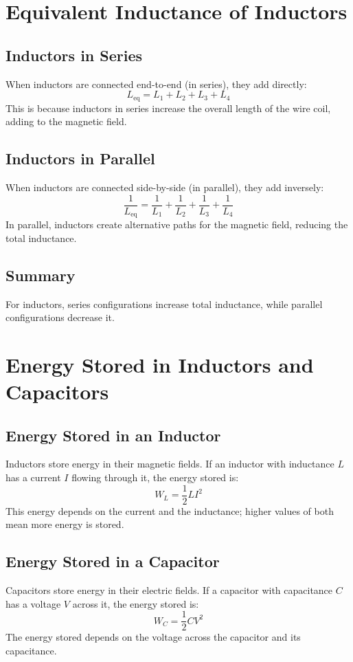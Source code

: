 \documentclass{article}
\begin{document}
\newpage
\section{Equivalent Inductance of Inductors}

\subsection{Inductors in Series}
When inductors are connected end-to-end (in series), they add directly:
\[
L_{\text{eq}} = L_1 + L_2 + L_3 + L_4
\]
This is because inductors in series increase the overall length of the wire coil, adding to the magnetic field.

\subsection{Inductors in Parallel}
When inductors are connected side-by-side (in parallel), they add inversely:
\[
\frac{1}{L_{\text{eq}}} = \frac{1}{L_1} + \frac{1}{L_2} + \frac{1}{L_3} + \frac{1}{L_4}
\]
In parallel, inductors create alternative paths for the magnetic field, reducing the total inductance.

\subsection{Summary}
For inductors, series configurations increase total inductance, while parallel configurations decrease it.

\newpage
\section{Energy Stored in Inductors and Capacitors}

\subsection{Energy Stored in an Inductor}
Inductors store energy in their magnetic fields. If an inductor with inductance \( L \) has a current \( I \) flowing through it, the energy stored is:
\[
W_L = \frac{1}{2} L I^2
\]
This energy depends on the current and the inductance; higher values of both mean more energy is stored.

\subsection{Energy Stored in a Capacitor}
Capacitors store energy in their electric fields. If a capacitor with capacitance \( C \) has a voltage \( V \) across it, the energy stored is:
\[
W_C = \frac{1}{2} C V^2
\]
The energy stored depends on the voltage across the capacitor and its capacitance.
\end{document}
